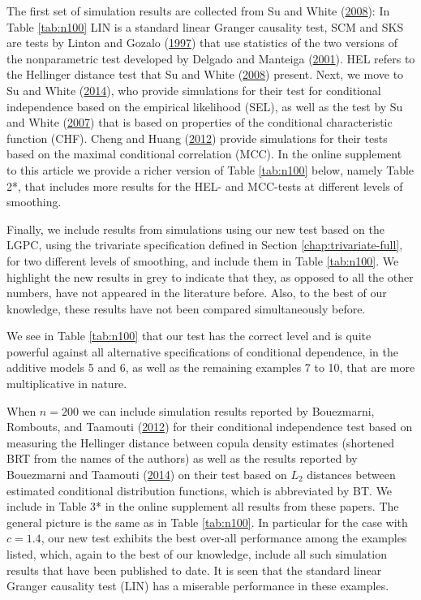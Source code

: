 \documentclass[
  12pt,
  letterpaper]{article}
\theoremstyle{definition}
\theoremstyle{definition}
\theoremstyle{definition}
\theoremstyle{remark}
\begin{document}
The first set of simulation results are collected from Su and White (\protect\hyperlink{ref-su2008nonparametric}{2008}): In Table \ref{tab:n100} LIN is a standard linear Granger causality test, SCM and SKS are tests by Linton and Gozalo (\protect\hyperlink{ref-linton1997conditional}{1997}) that use statistics of the two versions of the nonparametric test developed by Delgado and Manteiga (\protect\hyperlink{ref-delgado2001significance}{2001}). HEL refers to the Hellinger distance test that Su and White (\protect\hyperlink{ref-su2008nonparametric}{2008}) present. Next, we move to Su and White (\protect\hyperlink{ref-su2014testing}{2014}), who provide simulations for their test for conditional independence based on the empirical likelihood (SEL), as well as the test by Su and White (\protect\hyperlink{ref-su2007consistent}{2007}) that is based on properties of the conditional characteristic function (CHF). Cheng and Huang (\protect\hyperlink{ref-cheng2012conditional}{2012}) provide simulations for their tests based on the maximal conditional correlation (MCC). In the online supplement to this article we provide a richer version of Table \ref{tab:n100} below, namely Table 2*, that includes more results for the HEL- and MCC-tests at different levels of smoothing.



Finally, we include results from simulations using our new test based on the LGPC, using the trivariate specification defined in Section \ref{chap:trivariate-full}, for two different levels of smoothing, and include them in Table \ref{tab:n100}. We highlight the new results in grey to indicate that they, as opposed to all the other numbers, have not appeared in the literature before. Also, to the best of our knowledge, these results have not been compared simultaneously before.

We see in Table \ref{tab:n100} that our test has the correct level and is quite powerful against all alternative specifications of conditional dependence, in the additive models 5 and 6, as well as the remaining examples 7 to 10, that are more multiplicative in nature.

When \(n=200\) we can include simulation results reported by Bouezmarni, Rombouts, and Taamouti (\protect\hyperlink{ref-bouezmarni2012nonparametric}{2012}) for their conditional independence test based on measuring the Hellinger distance between copula density estimates (shortened BRT from the names of the authors) as well as the results reported by Bouezmarni and Taamouti (\protect\hyperlink{ref-boue:taam:2014}{2014}) on their test based on \(L_2\) distances between estimated conditional distribution functions, which is abbreviated by BT. We include in Table 3* in the online supplement all results from these papers. The general picture is the same as in Table \ref{tab:n100}. In particular for the case with \(c=1.4\), our new test exhibits the best over-all performance among the examples listed, which, again to the best of our knowledge, include all such simulation results that have been published to date. It is seen that the standard linear Granger causality test (LIN) has a miserable performance in these examples.
\end{document}

